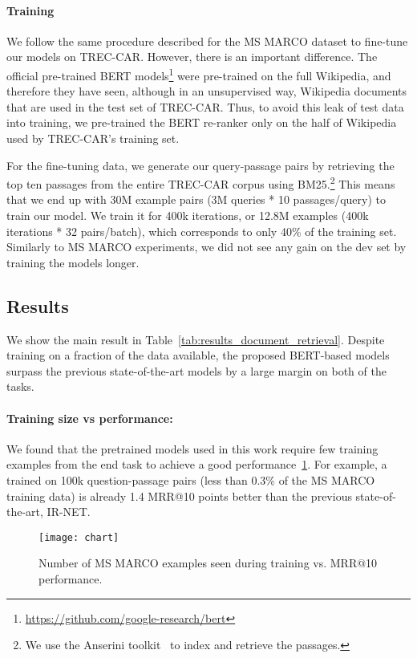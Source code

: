 \documentclass{article} \usepackage{iclr2019_conference}
\begin{document}
\paragraph{Training}

We follow the same procedure described for the MS MARCO dataset to fine-tune our models on TREC-CAR. However, there is an important difference. The official pre-trained BERT models\footnote{
\url{https://github.com/google-research/bert}
} 
were pre-trained on the full Wikipedia, and therefore they have seen, although in an unsupervised way, Wikipedia documents that are used in the test set of TREC-CAR. Thus, to avoid this leak of test data into training, we pre-trained the BERT re-ranker only on the half of Wikipedia used by TREC-CAR's training set.

For the fine-tuning data, we generate our query-passage pairs by retrieving the top ten passages from the entire TREC-CAR corpus using BM25.\footnote{We use the Anserini toolkit~\citep{yang2018anserini} to index and retrieve the passages.} This means that we end up with 30M example pairs (3M queries * 10 passages/query) to train our model. We train it for 400k iterations, or 12.8M examples (400k iterations * 32 pairs/batch), which corresponds to only 40\% of the training set. Similarly to MS MARCO experiments, we did not see any gain on the dev set by training the models longer.

\subsection{Results}

We show the main result in
Table~\ref{tab:results_document_retrieval}. Despite training on a fraction of the data available, the proposed BERT-based models surpass the previous state-of-the-art models by a large margin on both of the tasks.

\paragraph{Training size vs performance:} We found that the pretrained models used in this work require few training examples from the end task to achieve a good performance~\ref{fig:training_size}. For example, a  trained on 100k question-passage pairs (less than 0.3\% of the MS MARCO training data) is already 1.4 MRR@10 points better than the previous state-of-the-art, IR-NET.

\begin{figure}
\begin{center}
\centerline{\texttt{[image: chart]}}
\vspace{-4mm}
\caption{Number of MS MARCO examples seen during training vs. MRR@10 performance.} 
\label{fig:training_size}
\end{center}
\vspace{-6mm}
\end{figure}
\end{document}
